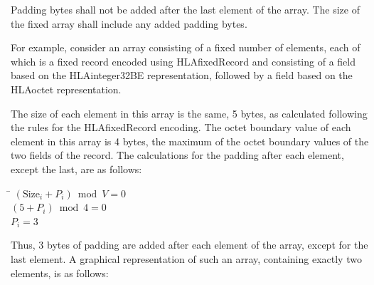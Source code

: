 Padding bytes shall not be added after the last element of the array. The size of the fixed array shall include any added padding bytes.

\newpage
For example, consider an array consisting of a fixed number of elements, each of which is a fixed record encoded using HLAfixedRecord and consisting of a field based on the HLAinteger32BE representation, followed by a field based on the HLAoctet representation.

The size of each element in this array is the same, 5 bytes, as calculated following the rules for the HLAfixedRecord encoding. The octet boundary value of each element in this array is 4 bytes, the maximum of the octet boundary values of the two fields of the record. The calculations for the padding after each element, except the last, are as follows:

\begin{tabbing}
    \hspace{18pt}\=\kill
    \> $(\mathrm{Size}_i + P_i) \bmod V = 0$\\
    \> $(5 + P_i) \bmod 4 = 0$\\
    \> $P_i = 3$
\end{tabbing}

Thus, 3 bytes of padding are added after each element of the array, except for the last element. A graphical representation of such an array, containing exactly two elements, is as follows:

\begin{center}
    \begingroup\fontsize{7.4}{8.5}\selectfont\setlength{\tabcolsep}{5.3pt}\renewcommand{\arraystretch}{1.38}
    \endgroup
\end{center}

